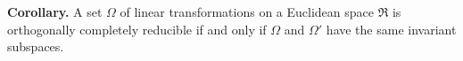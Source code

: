 \textbf{Corollary.} A set $\Omega$ of linear transformations on a Euclidean space $\Re$ is orthogonally completely reducible if and only if $\Omega$ and $\Omega'$ have the same invariant subspaces.
